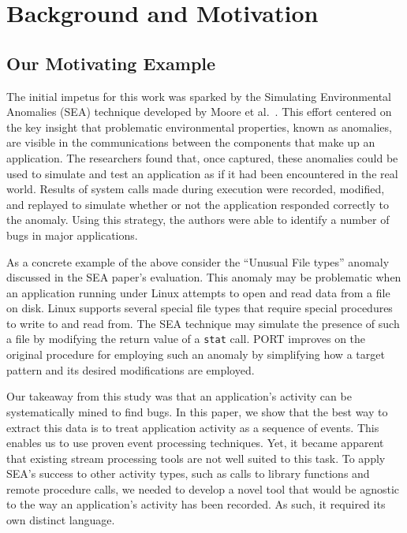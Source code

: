 \section{Background and Motivation}
\label{sec:PORTbackground}


\subsection{Our Motivating Example}
\label{sec:MotivatingExample}

The initial impetus for this work was sparked by the Simulating Environmental Anomalies (SEA) technique developed by Moore et al.~\cite{DBLP:conf/issre/MooreCFW19}.
This effort centered on the key insight
that problematic
environmental properties,
known as anomalies, are visible in the
communications between the components that make up an application.
The researchers found that,
once captured,
these anomalies
could be
used to simulate and
test
an application as if
it had been encountered
in the real world.
Results of system calls made
during execution were recorded, modified, and replayed to simulate whether or not the application
responded correctly to the anomaly.
Using this strategy, the authors were able to identify a number of bugs
in major applications.

As a concrete example of the above
consider the ``Unusual File types'' anomaly
discussed in the SEA paper's evaluation.
This anomaly may be problematic
when an application running under Linux
attempts to open and read data from a file on disk.
Linux supports several special file types  that require special procedures to
write to and
read from.
The SEA technique
may simulate the presence of such a file by
modifying
the return value
of a {\tt stat} call.
PORT improves on the original procedure for employing such an anomaly
by simplifying how a target pattern
and its desired modifications are employed.

Our takeaway
from this study
was that an application's activity
can be systematically mined to find bugs.
In this paper, we
show that the best way to extract this data
is to treat application activity
as a sequence of events. This enables us to use
proven event processing techniques.
Yet, it became apparent that existing
stream processing tools
are not well suited to this task. To apply
SEA's success to other activity types,
such as calls to library functions
and remote procedure calls, we needed to develop a novel tool that would be  agnostic to the way an application's activity has been recorded. As such, it required its own  distinct language.


